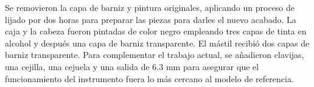 Se removieron la capa de barniz y pintura originales, aplicando un proceso de lijado por dos horas para preparar las piezas para darles el nuevo 
acabado. La caja y la cabeza fueron pintadas de color negro empleando tres capas de tinta en alcohol y despu\'es una capa de barniz transparente. 
El m\'astil recibi\'o dos capas de barniz transparente. Para complementar el trabajo actual, se a\~nadieron clavijas, una cejilla, una cejuela y 
una salida de 6.3 mm para asegurar que el funcionamiento del instrumento fuera lo m\'as cercano al modelo de referencia.